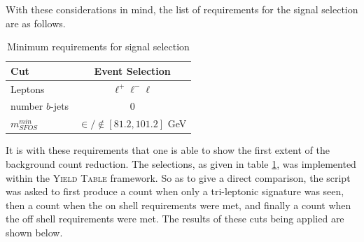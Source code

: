 With these considerations in mind, the list of requirements for the signal selection are as follows.

\begin{table}[H]
\begin{center}
\begin{tabular}{l | c}
\toprule
Cut & Event Selection \\
\hline
Leptons & $\ell^{+} \ell^{-} \ell$ \\
\hline \hline
number $b$-jets & 0 \\
\hline
$m_{SFOS}^{min}$ & $\in/\notin [81.2, 101.2]$ GeV \\
\bottomrule
\end{tabular}
\end{center}
\caption{Minimum requirements for signal selection}
\label{tab:minCuts}
\end{table}

\noindent It is with these requirements that one is able to show the first extent of the background count reduction.
The selections, as given in table \ref{tab:minCuts}, was implemented within the Y{\scshape ield Table} framework.
So as to give a direct comparison, the script was asked to first produce a count when only a tri-leptonic signature was seen, then  a count when the on shell requirements were met, and finally a count when the off shell requirements were met.
The results of these cuts being applied are shown below.

